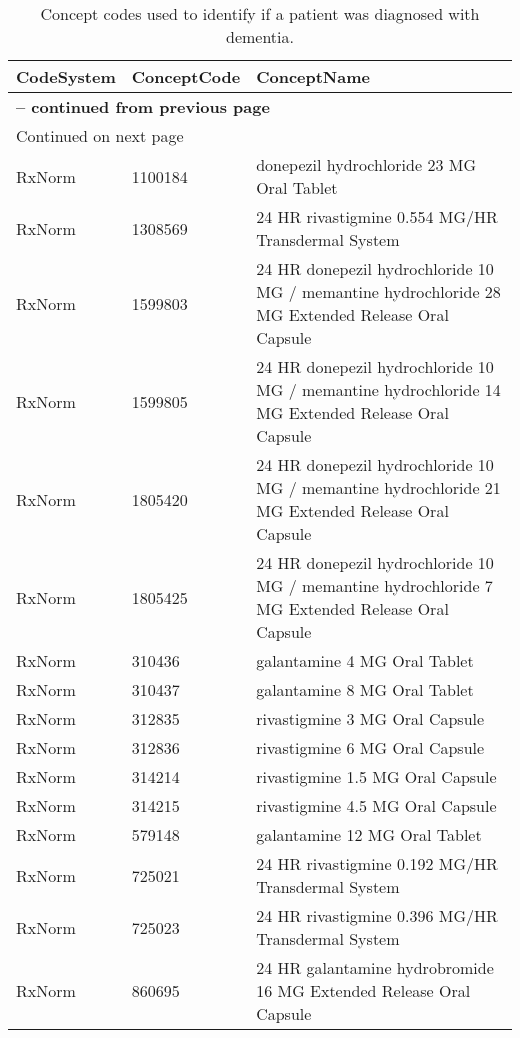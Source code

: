 \begin{longtable}{p{}p{}p{}}
\caption{Concept codes used to identify if a patient was diagnosed with dementia.} \\ 
 CodeSystem & ConceptCode & ConceptName \\ 
  \hline 
\endfirsthead 
\multicolumn{3}{p{\textwidth}}{{ \bfseries \tablename \thetable{} -- continued from previous page}} \ 
\hline CodeSystem & ConceptCode & ConceptName \\ \hline 
\endhead 
\hline \multicolumn{3}{p{\textwidth}}{{Continued on next page}} \\ \hline 
\endfoot 
\hline 
\endlastfoot 
 \hline
RxNorm & 1100184 & donepezil hydrochloride 23 MG Oral Tablet \\ 
  RxNorm & 1308569 & 24 HR rivastigmine 0.554 MG/HR Transdermal System \\ 
  RxNorm & 1599803 & 24 HR donepezil hydrochloride 10 MG / memantine hydrochloride 28 MG Extended Release Oral Capsule \\ 
  RxNorm & 1599805 & 24 HR donepezil hydrochloride 10 MG / memantine hydrochloride 14 MG Extended Release Oral Capsule \\ 
  RxNorm & 1805420 & 24 HR donepezil hydrochloride 10 MG / memantine hydrochloride 21 MG Extended Release Oral Capsule \\ 
  RxNorm & 1805425 & 24 HR donepezil hydrochloride 10 MG / memantine hydrochloride 7 MG Extended Release Oral Capsule \\ 
  RxNorm & 310436 & galantamine 4 MG Oral Tablet \\ 
  RxNorm & 310437 & galantamine 8 MG Oral Tablet \\ 
  RxNorm & 312835 & rivastigmine 3 MG Oral Capsule \\ 
  RxNorm & 312836 & rivastigmine 6 MG Oral Capsule \\ 
  RxNorm & 314214 & rivastigmine 1.5 MG Oral Capsule \\ 
  RxNorm & 314215 & rivastigmine 4.5 MG Oral Capsule \\ 
  RxNorm & 579148 & galantamine 12 MG Oral Tablet \\ 
  RxNorm & 725021 & 24 HR rivastigmine 0.192 MG/HR Transdermal System \\ 
  RxNorm & 725023 & 24 HR rivastigmine 0.396 MG/HR Transdermal System \\ 
  RxNorm & 860695 & 24 HR galantamine hydrobromide 16 MG Extended Release Oral Capsule \\ 

\end{longtable}
